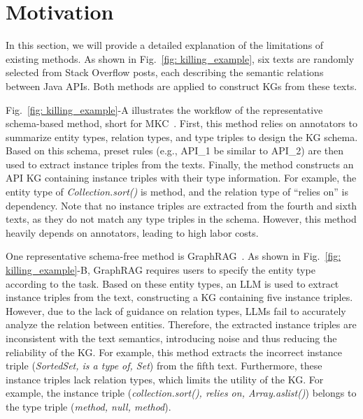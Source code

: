 \section{Motivation}
In this section, we will provide a detailed explanation of the limitations of existing methods.
As shown in Fig.~\ref{fig: killing_example}, six texts are randomly selected from Stack Overflow posts, each describing the semantic relations between Java APIs.
Both methods are applied to construct KGs from these texts.

Fig.~\ref{fig: killing_example}-A illustrates the workflow of the representative schema-based method, short for MKC~\cite{huang2022se}.
First, this method relies on annotators to summarize entity types, relation types, and type triples to design the KG schema.
Based on this schema, preset rules (e.g., API\_1 be similar to API\_2) are then used to extract instance triples from the texts.
Finally, the method constructs an API KG containing instance triples with their type information.
For example, the entity type of \textit{Collection.sort()} is method, and the relation type of ``relies on'' is dependency.
Note that no instance triples are extracted from the fourth and sixth texts, as they do not match any type triples in the schema.
However, this method heavily depends on annotators, leading to high labor costs.

One representative schema-free method is GraphRAG~\cite{GraphRAG}.
As shown in Fig.~\ref{fig: killing_example}-B, GraphRAG requires users to specify the entity type according to the task.
Based on these entity types, an LLM is used to extract instance triples from the text, constructing a KG containing five instance triples.
However, due to the lack of guidance on relation types, LLMs fail to accurately analyze the relation between entities.
Therefore, the extracted instance triples are inconsistent with the text semantics, introducing noise and thus reducing the reliability of the KG.
For example, this method extracts the incorrect instance triple (\textit{SortedSet, is a type of, Set}) from the fifth text.
Furthermore, these instance triples lack relation types, which limits the utility of the KG.
For example, the instance triple (\textit{collection.sort(), relies on, Array.aslist()}) belongs to the type triple (\textit{method, null, method}).


